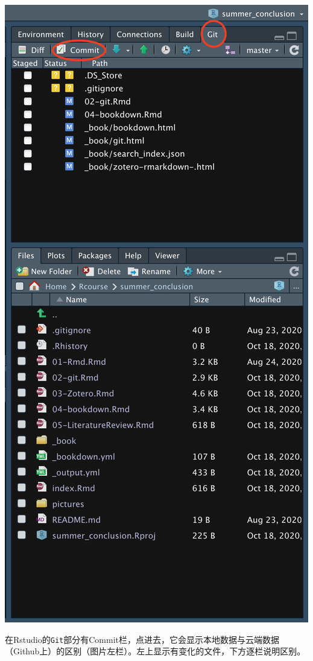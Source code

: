 \documentclass[
  letterpaper,
  DIV=11,
  numbers=noendperiod,
  oneside]{scrreprt}
\begin{document}
\includegraphics{./images/git_panel.png}

在Rstudio的\texttt{Git}部分有Commit栏，点进去，它会显示本地数据与云端数据（Github上）的区别（图片左栏）。左上显示有变化的文件，下方逐栏说明区别。
\end{document}
